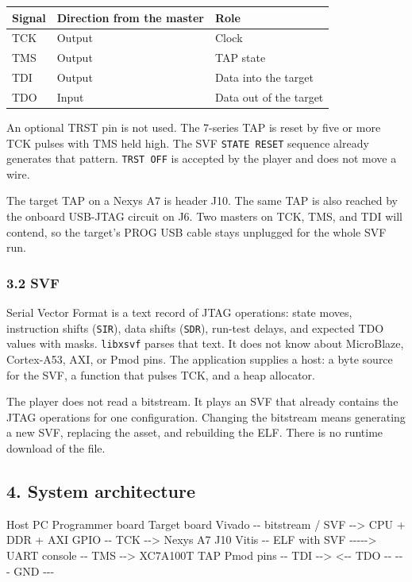 \documentclass[
  11pt,
  a4paper,
]{article}
\newenvironment{Shaded}{}{}
\newcommand{\NormalTok}[1]{#1}
\newcounter{none} %
\begin{document}
{\def\LTcaptype{none} %
\begin{longtable}[]{@{}lll@{}}
\toprule\noalign{}
Signal & Direction from the master & Role \\
\midrule\noalign{}
\endhead
\bottomrule\noalign{}
\endlastfoot
TCK & Output & Clock \\
TMS & Output & TAP state \\
TDI & Output & Data into the target \\
TDO & Input & Data out of the target \\
\end{longtable}
}

An optional TRST pin is not used. The 7-series TAP is reset by five or
more TCK pulses with TMS held high. The SVF \texttt{STATE\ RESET}
sequence already generates that pattern. \texttt{TRST\ OFF} is accepted
by the player and does not move a wire.

The target TAP on a Nexys A7 is header J10. The same TAP is also reached
by the onboard USB-JTAG circuit on J6. Two masters on TCK, TMS, and TDI
will contend, so the target's PROG USB cable stays unplugged for the
whole SVF run.

\subsubsection{3.2 SVF}\label{svf}

Serial Vector Format is a text record of JTAG operations: state moves,
instruction shifts (\texttt{SIR}), data shifts (\texttt{SDR}), run-test
delays, and expected TDO values with masks. \texttt{libxsvf} parses that
text. It does not know about MicroBlaze, Cortex-A53, AXI, or Pmod pins.
The application supplies a host: a byte source for the SVF, a function
that pulses TCK, and a heap allocator.

The player does not read a bitstream. It plays an SVF that already
contains the JTAG operations for one configuration. Changing the
bitstream means generating a new SVF, replacing the asset, and
rebuilding the ELF. There is no runtime download of the file.

\subsection{4. System architecture}\label{system-architecture}

\begin{Shaded}
\begin{Highlighting}[]
\NormalTok{Host PC                         Programmer board                    Target board}
\NormalTok{Vivado  {-}{-} bitstream / SVF {-}{-}\textgreater{}  CPU + DDR + AXI GPIO  {-}{-} TCK  {-}{-}\textgreater{}   Nexys A7 J10}
\NormalTok{Vitis   {-}{-} ELF with SVF {-}{-}{-}{-}{-}\textgreater{}  UART console          {-}{-} TMS  {-}{-}\textgreater{}   XC7A100T TAP}
\NormalTok{                                Pmod pins             {-}{-} TDI  {-}{-}\textgreater{}}
\NormalTok{                                                      \textless{}{-}{-} TDO {-}{-}}
\NormalTok{                                                      {-}{-}{-} GND {-}{-}{-}}
\end{Highlighting}
\end{Shaded}
\end{document}
